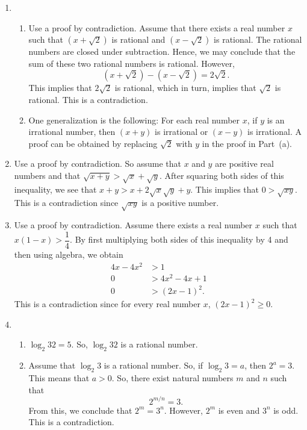 \begin{enumerate}
\item \begin{enumerate}
\item Use a proof by contradiction.  Assume that there exists a real number $x$ such that 
$(x + \sqrt{2})$ is rational and $(x - \sqrt{2})$ is rational.  The rational numbers are closed under subtraction.  Hence, we may conclude that the sum of these two rational numbers is rational.  However,
\[
(x + \sqrt{2}) - (x - \sqrt{2}) = 2 \sqrt{2}.
\]
This implies that $2 \sqrt{2}$ is rational, which in turn, implies that $\sqrt{2}$ is rational.  This is a contradiction.

\item One generalization is the following:  For each real number $x$, if $y$ is an irrational number, then $(x + y)$ is irrational or $(x - y)$ is irrational.  A proof can be obtained by replacing $\sqrt{2}$ with $y$ in the proof in Part~(a).
\end{enumerate}



\item Use a proof by contradiction.  So assume that $x$ and $y$ are positive real numbers and that $\sqrt{x + y} > \sqrt{x} + \sqrt{y}$.  After squaring both sides of this inequality, we see that $x + y > x + 2 \sqrt{x} \sqrt{y} + y$.  This implies that $0 > \sqrt{xy}$.  This is a contradiction since $\sqrt{xy}$ is a positive number.


\item Use a proof by contradiction.  Assume there exists a real number $x$ such that 
$x(1 - x) > \dfrac{1}{4}$.  By first multiplying both sides of this inequality by 4 and then using algebra, we obtain
\begin{align*}
4x - 4x^2 &> 1 \\
        0 &> 4x^2 - 4x + 1 \\
        0 &> (2x - 1)^2.
\end{align*}
This is a contradiction since for every real number $x$, $(2x - 1)^2 \geq 0$.


\item
\begin{enumerate}
\item $\log_2 32 = 5$.  So, $\log_2 32$ is a rational number.

\item Assume that $\log_2 3$ is a rational number.  So, if $\log_2 3 = a$, then $2^a = 3$.  This means that $a > 0$.  So, there exist natural numbers $m$ and $n$ such that
\[
2^{m/n} = 3.
\]
From this, we conclude that $2^m = 3^n$.  However, $2^m$ is even and $3^n$ is odd.  This is a contradiction.
\end{enumerate}



\end{enumerate}
